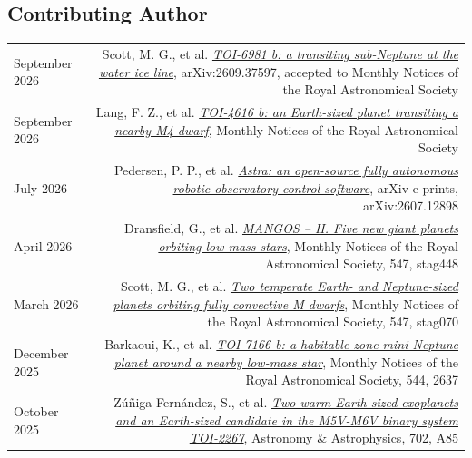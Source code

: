 \documentclass{article}
\begin{document}
\subsection*{Contributing Author}

\begin{longtable}{L!{\vrule}R}
    September 2026 &
    Scott, M. G., et al.
    \href{https://ui.adsabs.harvard.edu/abs/2026arXiv260937597S/abstract}{\textit{TOI-6981 b: a transiting sub-Neptune at the water ice line}},
    arXiv:2609.37597, accepted to Monthly Notices of the Royal Astronomical Society \\

    September 2026 &
    Lang, F. Z., et al.
    \href{https://ui.adsabs.harvard.edu/abs/2026MNRAS.tmp.1622L/abstract}{\textit{TOI-4616 b: an Earth-sized planet transiting a nearby M4 dwarf}},
    Monthly Notices of the Royal Astronomical Society \\

    July 2026 &
    Pedersen, P. P., et al.
    \href{https://ui.adsabs.harvard.edu/abs/2026arXiv260712898P/abstract}{\textit{Astra: an open-source fully autonomous robotic observatory control software}},
    arXiv e-prints, arXiv:2607.12898 \\

    April 2026 &
    Dransfield, G., et al.
    \href{https://ui.adsabs.harvard.edu/abs/2026MNRAS.547ag448D/abstract}{\textit{MANGOS -- II. Five new giant planets orbiting low-mass stars}},
    Monthly Notices of the Royal Astronomical Society, 547, stag448 \\

    March 2026 &
    Scott, M. G., et al.
    \href{https://ui.adsabs.harvard.edu/abs/2026MNRAS.547ag070S/abstract}{\textit{Two temperate Earth- and Neptune-sized planets orbiting fully convective M dwarfs}},
    Monthly Notices of the Royal Astronomical Society, 547, stag070 \\

    December 2025 &
    Barkaoui, K., et al.
    \href{https://ui.adsabs.harvard.edu/abs/2025MNRAS.544.2637B/abstract}{\textit{TOI-7166 b: a habitable zone mini-Neptune planet around a nearby low-mass star}},
    Monthly Notices of the Royal Astronomical Society, 544, 2637 \\

    October 2025 &
    Zúñiga-Fernández, S., et al.
    \href{https://ui.adsabs.harvard.edu/abs/2025A%26A...702A..85Z/abstract}{\textit{Two warm Earth-sized exoplanets and an Earth-sized candidate in the M5V-M6V binary system TOI-2267}},
    Astronomy \& Astrophysics, 702, A85 \\


\end{longtable}
\end{document}
